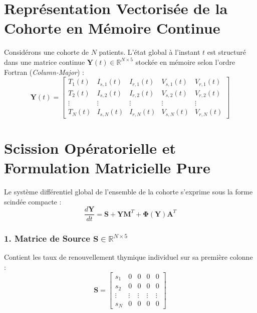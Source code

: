 \documentclass[11pt,a4paper]{report}
\theoremstyle{plain}
\theoremstyle{definition}
\theoremstyle{remark}
\begin{document}
\section{Représentation Vectorisée de la Cohorte en Mémoire Continue}
Considérons une cohorte de $N$ patients. L'état global à l'instant $t$ est structuré dans une matrice continue $\mathbf{Y}(t) \in \mathbb{R}^{N \times 5}$ stockée en mémoire selon l'ordre Fortran (\textit{Column-Major}) :
\begin{equation}
\mathbf{Y}(t) = \begin{bmatrix}
T_1(t) & I_{s,1}(t) & I_{r,1}(t) & V_{s,1}(t) & V_{r,1}(t) \\
T_2(t) & I_{s,2}(t) & I_{r,2}(t) & V_{s,2}(t) & V_{r,2}(t) \\
\vdots & \vdots & \vdots & \vdots & \vdots \\
T_N(t) & I_{s,N}(t) & I_{r,N}(t) & V_{s,N}(t) & V_{r,N}(t)
\end{bmatrix}
\end{equation}

\section{Scission Opératorielle et Formulation Matricielle Pure}
Le système différentiel global de l'ensemble de la cohorte s'exprime sous la forme scindée compacte :
\begin{equation}
\label{eq:matrix_ode}
\frac{d\mathbf{Y}}{dt} = \mathbf{S} + \mathbf{Y} \mathbf{M}^T + \mathbf{\Phi}(\mathbf{Y}) \mathbf{A}^T
\end{equation}

\subsubsection{1. Matrice de Source $\mathbf{S} \in \mathbb{R}^{N \times 5}$}
Contient les taux de renouvellement thymique individuel sur sa première colonne :
\begin{equation}
\mathbf{S} = \begin{bmatrix} s_1 & 0 & 0 & 0 & 0 \\ s_2 & 0 & 0 & 0 & 0 \\ \vdots & \vdots & \vdots & \vdots & \vdots \\ s_N & 0 & 0 & 0 & 0 \end{bmatrix}
\end{equation}
\end{document}
